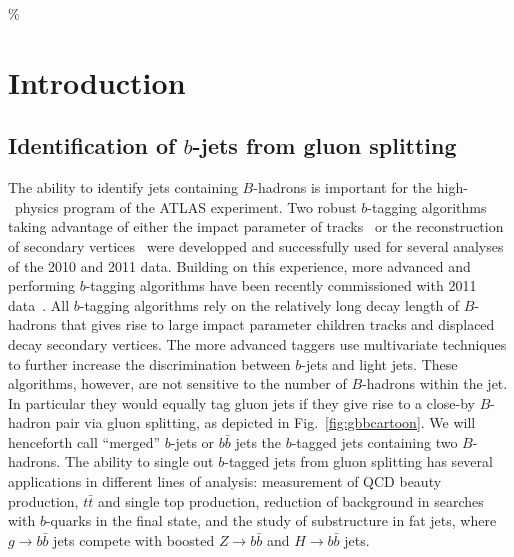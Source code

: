 \%
%
\chapter{Introduction}


\section{Identification of $b$-jets from gluon splitting}\label{sec:introduction}


The ability to identify jets containing $B$-hadrons is important for the high-\pt\ physics program of the ATLAS experiment. Two robust $b$-tagging algorithms taking
advantage of either the impact parameter of tracks~\cite{ATLAS-CONF-2010-091} or the reconstruction of secondary vertices~\cite{ATLAS-CONF-2010-042} were developped and successfully used for several analyses of the 2010 and 2011 data. Building on this experience, more advanced and performing $b$-tagging algorithms have been recently commissioned with 2011 data~\cite{ATLAS-CONF-2011-102}.
All $b$-tagging algorithms rely on the relatively long decay length of $B$-hadrons that gives rise to large impact parameter children tracks and displaced decay secondary vertices. The more advanced taggers %
use multivariate techniques %
to further increase the discrimination between $b$-jets and light jets.
These algorithms, however, are not sensitive to the number of $B$-hadrons within the jet. In particular they would equally tag gluon jets if they give rise to a close-by $B$-hadron pair via gluon splitting, as depicted in Fig.~\ref{fig:gbbcartoon}. We will henceforth call ``merged'' $b$-jets or $b \bar{b}$ jets the $b$-tagged jets containing two $B$-hadrons. The ability to single out $b$-tagged jets from gluon splitting has several applications in different lines of analysis: measurement of QCD beauty production, $t\bar{t}$ and single top production, reduction of background in searches with $b$-quarks in the final state, and the study of substructure in fat jets, where $g\rightarrow b\bar{b}$ jets compete with boosted $Z\rightarrow b\bar{b}$ and $H\rightarrow b\bar{b}$ jets.
